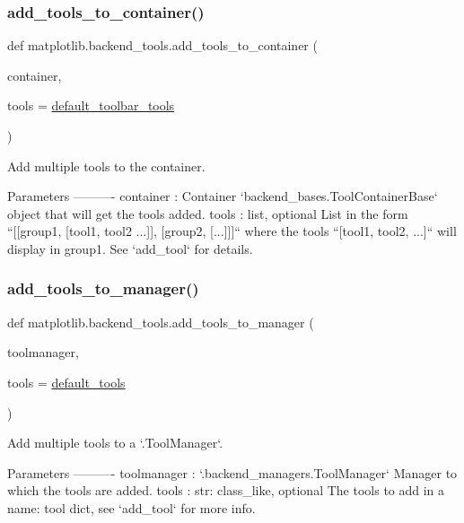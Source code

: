 \subsubsection{\texorpdfstring{add\+\_\+tools\+\_\+to\+\_\+container()}{add\_tools\_to\_container()}}
{\footnotesize\ttfamily def matplotlib.\+backend\+\_\+tools.\+add\+\_\+tools\+\_\+to\+\_\+container (\begin{DoxyParamCaption}\item[{}]{container,  }\item[{}]{tools = {\ttfamily \hyperlink{namespacematplotlib_1_1backend__tools_a5a62cc4cdc0d0dce97359b3133ef5113}{default\+\_\+toolbar\+\_\+tools}} }\end{DoxyParamCaption})}

\begin{DoxyVerb}Add multiple tools to the container.

Parameters
----------
container : Container
    `backend_bases.ToolContainerBase` object that will get the tools added.
tools : list, optional
    List in the form ``[[group1, [tool1, tool2 ...]], [group2, [...]]]``
    where the tools ``[tool1, tool2, ...]`` will display in group1.
    See `add_tool` for details.
\end{DoxyVerb}
 \mbox{\label{namespacematplotlib_1_1backend__tools_a2ce533a44709b5460ac55ac37af7c4c4}} 
\subsubsection{\texorpdfstring{add\+\_\+tools\+\_\+to\+\_\+manager()}{add\_tools\_to\_manager()}}
{\footnotesize\ttfamily def matplotlib.\+backend\+\_\+tools.\+add\+\_\+tools\+\_\+to\+\_\+manager (\begin{DoxyParamCaption}\item[{}]{toolmanager,  }\item[{}]{tools = {\ttfamily \hyperlink{namespacematplotlib_1_1backend__tools_a8e5bd024d90b17a4841e51893bb2f2c8}{default\+\_\+tools}} }\end{DoxyParamCaption})}

\begin{DoxyVerb}Add multiple tools to a `.ToolManager`.

Parameters
----------
toolmanager : `.backend_managers.ToolManager`
    Manager to which the tools are added.
tools : {str: class_like}, optional
    The tools to add in a {name: tool} dict, see `add_tool` for more
    info.
\end{DoxyVerb}
 

